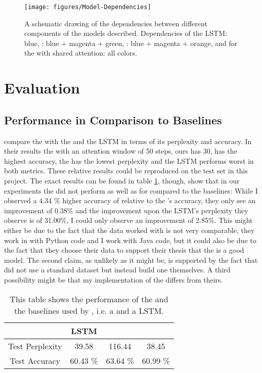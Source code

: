 \documentclass[11pt]{article}
\begin{document}
\begin{figure}
\centering
\texttt{[image: figures/Model-Dependencies]}
\caption{A schematic drawing of the dependencies between different components of the models described. Dependencies of the LSTM: blue, \lmatt: blue + magenta + green, \spn: blue + magenta + orange, and for the \spn with shared attention: all colors.} 
\label{dependencies}
\end{figure}

\section{Evaluation}

\subsection{\spn Performance in Comparison to Baselines}
\cite{bhoopchand2016learning} compare the \spn with the \lmatt and the LSTM in terms of its perplexity and accuracy. In their results the \lmatt with an attention window of 50 steps, ours has 30, has the highest accuracy, the \spn has the lowest perplexity and the LSTM performs worst in both metrics. These relative results could be reproduced on the test set in this project. The exact results can be found in table \ref{spn_perf}, though, show that in our experiments the \spn did not perform as well as for \cite{bhoopchand2016learning} compared to the baselines: While I observed a 4.34 \% higher accuracy of \lmatt relative to the \spn's accuracy, they only see an improvement of 0.38\% and the improvement upon the LSTM's perplexity they observe is of 31.00\%, I could only observe an improvement of 2.85\%. This might either be due to the fact that the data worked with is not very comparable, they work in with Python code and I work with Java code, but it could also be due to the fact that they choose their data to support their thesis that the \spn is a good model. The second claim, as unlikely as it might be, is supported by the fact that \cite{bhoopchand2016learning} did not use a standard dataset but instead build one themselves. A third possibility might be that my implementation of the \spn differs from theirs.
\begin{table}
\centering
	\begin{tabular}{c | c | c | c}
		  & LSTM & \lmatt & \spn\\\hline
		Test Perplexity & 39.58 & 116.44 & 38.45	\\\hline
		Test Accuracy & 60.43 \% & 63.64 \% & 60.99 \%
	\end{tabular}
\label{spn_perf}
\caption{This table shows the performance of the \spn and the baselines used by \cite{bhoopchand2016learning}, i.e. a \lmatt and a LSTM.}
\end{table}
\end{document}
